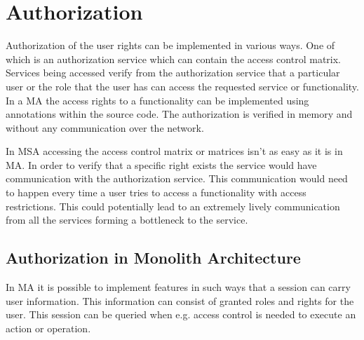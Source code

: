 

\section{Authorization}
\begin{sloppypar}
    Authorization of the user rights can be implemented in various ways. One of 
    which is an authorization service which can contain the access control 
    matrix. Services being accessed verify from the authorization service that 
    a particular user or the role that the user has can access the requested 
    service or functionality. In a MA the access rights to a functionality can 
    be implemented using annotations within the source code. The authorization 
    is verified in memory and without any communication over the network. 
\end{sloppypar}
\begin{sloppypar}
    In MSA accessing the access control matrix or matrices isn’t as easy as it 
    is in MA. In order to verify that a specific right exists the service would 
    have communication with the authorization service. This communication would 
    need to happen every time a user tries to access a functionality with 
    access restrictions. This could potentially lead to an extremely lively 
    communication from all the services forming a bottleneck to the service.
\end{sloppypar}

\subsection{Authorization in Monolith Architecture}
\begin{sloppypar}
    In MA it is possible to implement features in such ways that a session can 
    carry user information. This information can consist of granted roles and 
    rights for the user. This session can be queried when e.g. access control 
    is needed to execute an action or operation.
\end{sloppypar}



